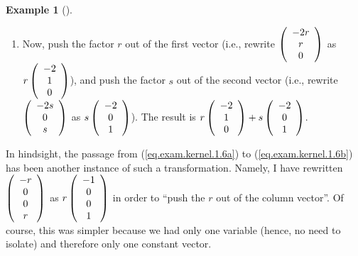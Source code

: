 \documentclass[numbers=enddot,12pt,final,onecolumn,notitlepage]{scrartcl}%
\theoremstyle{definition}
\newtheorem{exam}[theo]{Example}
\newenvironment{example}[1][]
{\begin{exam}[#1]\begin{leftbar}}
{\end{leftbar}\end{exam}}
\begin{document}
\begin{example}
\begin{enumerate}
\item Now, push the factor $r$ out of the first vector (i.e., rewrite $\left(
%
\begin{array}
[c]{c}%
-2r\\
r\\
0
\end{array}
\right)  $ as $r\left(
\begin{array}
[c]{c}%
-2\\
1\\
0
\end{array}
\right)  $), and push the factor $s$ out of the second vector (i.e., rewrite
$\left(
\begin{array}
[c]{c}%
-2s\\
0\\
s
\end{array}
\right)  $ as $s\left(
\begin{array}
[c]{c}%
-2\\
0\\
1
\end{array}
\right)  $). The result is $r\left(
\begin{array}
[c]{c}%
-2\\
1\\
0
\end{array}
\right)  +s\left(
\begin{array}
[c]{c}%
-2\\
0\\
1
\end{array}
\right)  $.
\end{enumerate}

In hindsight, the passage from (\ref{eq.exam.kernel.1.6a}) to
(\ref{eq.exam.kernel.1.6b}) has been another instance of such a
transformation. Namely, I have rewritten $\left(
\begin{array}
[c]{c}%
-r\\
0\\
0\\
r
\end{array}
\right)  $ as $r\left(
\begin{array}
[c]{c}%
-1\\
0\\
0\\
1
\end{array}
\right)  $ in order to \textquotedblleft push the $r$ out of the column
vector\textquotedblright. Of course, this was simpler because we had only one
variable (hence, no need to isolate) and therefore only one constant vector.


\end{example}
\end{document}
